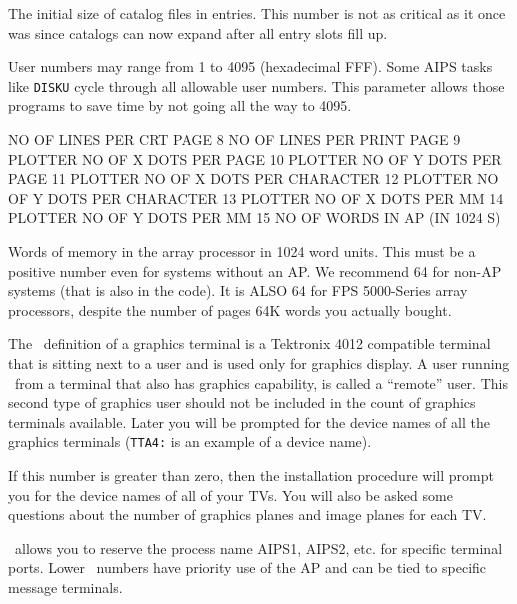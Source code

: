 \medskip

\noindent
The initial size of catalog files in entries.  This number is not as
critical as it once was since catalogs can now expand after all entry
slots fill up.\medskip

\medskip

\noindent
User numbers may range from 1 to 4095 (hexadecimal FFF).  Some AIPS
tasks like {\tt DISKU} cycle through all allowable user numbers.  This
parameter allows those programs to save time by not going all the way
to 4095.\medskip

    NO OF LINES PER CRT PAGE
8    NO OF LINES PER PRINT PAGE
9    PLOTTER NO OF X DOTS PER PAGE
10   PLOTTER NO OF Y DOTS PER PAGE
11   PLOTTER NO OF X DOTS PER CHARACTER
12   PLOTTER NO OF Y DOTS PER CHARACTER
13   PLOTTER NO OF X DOTS PER MM
14   PLOTTER NO OF Y DOTS PER MM
15   NO OF WORDS IN AP (IN 1024 S)
\endfortran\medskip

Words of memory in the array processor in 1024 word units.  This must
be a positive number even for systems without an AP.  We recommend 64
for non-AP systems (that is also in the code).  It is ALSO 64 for FPS
5000-Series array processors, despite the number of pages 64K words you
actually bought.\medskip

\medskip

\noindent
The \aips\ definition of a graphics terminal is a Tektronix 4012
compatible terminal that is sitting next to a user and is used only for
graphics display.  A user running \aips\ from a terminal that also has
graphics capability, is called a ``remote'' user.  This second type of
graphics user should not be included in the count of graphics terminals
available.  Later you will be prompted for the device names of all the
graphics terminals ({\tt TTA4:} is an example of a device name).\medskip

\medskip

\noindent
If this number is greater than zero, then the installation procedure
will prompt you for the device names of all of your TVs.  You will also
be asked some questions about the number of graphics planes and image
planes for each TV.\medskip

\medskip

\noindent
\aips\ allows you to reserve the process name AIPS1, AIPS2, etc. for
specific terminal ports.  Lower \aips\ numbers have priority use of the
AP and can be tied to specific message terminals.\medskip

